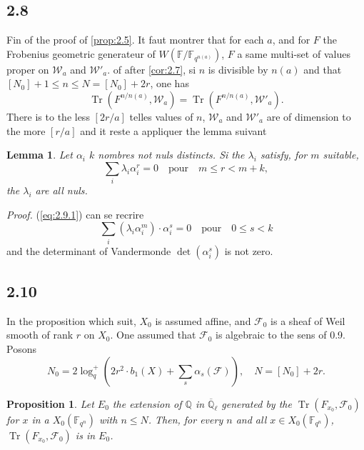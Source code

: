 \documentclass[11pt,a4paper]{article}
\theoremstyle{plain}
\newtheorem{lemma}[theorem]{Lemma}
\newtheorem{proposition}[theorem]{Proposition}
\theoremstyle{definition}
\DeclareMathOperator{\tr}{Tr}
\begin{document}
\subsection{2.8}

Fin of the proof of \ref{prop:2.5}. It faut montrer that for each $a$, and for $F$ the Frobenius geometric generateur of $W(\mathbb{F}/\mathbb{F}_{q^{n(a)}})$, $F$ a same multi-set of values proper on $\mathcal{W}_a$ and $\mathcal{W}'_a$. of after \ref{cor:2.7}, si $n$ is divisible by $n(a)$ and that $[N_0]+1 \leq n \leq N = [N_0]+2r$, one has
\[
\tr(F^{n/n(a)}, \mathcal{W}_a) = \tr(F^{n/n(a)}, \mathcal{W}'_a).
\]
There is to the less $[2r/a]$ telles values of $n$, $\mathcal{W}_a$ and $\mathcal{W}'_a$ are of dimension to the more $[r/a]$ and it reste a appliquer the lemma suivant

\begin{lemma}\label{lem:2.9}
Let $\alpha_i$ $k$ nombres not nuls distincts. Si the $\lambda_i$ satisfy, for $m$ suitable,
\begin{equation}\label{eq:2.9.1}
\sum_i \lambda_i \alpha_i^r = 0 \quad \text{pour} \quad m \leq r < m+k,
\end{equation}
the $\lambda_i$ are all nuls.
\end{lemma}

\noindent\textit{Proof.} (\ref{eq:2.9.1}) can se recrire
\[
\sum_i (\lambda_i \alpha_i^m) \cdot \alpha_i^s = 0 \quad \text{pour} \quad 0 \leq s < k
\]
and the determinant of Vandermonde $\det(\alpha_i^s)$ is not zero.

\subsection{2.10}

In the proposition which suit, $X_0$ is assumed affine, and $\mathcal{F}_0$ is a sheaf of Weil smooth of rank $r$ on $X_0$. One assumed that $\mathcal{F}_0$ is algebraic to the sens of 0.9. Posons
\[
N_0 = 2\log_q^+\left(2r^2 \cdot b_1(X) + \sum_s \alpha_s(\mathcal{F})\right), \quad N = [N_0] + 2r.
\]
\begin{proposition}\label{prop:2.10}
Let $E_0$ the extension of $\mathbb{Q}$ in $\overline{\mathbb{Q}}_\ell$ generated by the $\tr(F_{x_0}, \mathcal{F}_0)$ for $x$ in a $X_0(\mathbb{F}_{q^n})$ with $n \leq N$. Then, for every $n$ and all $x \in X_0(\mathbb{F}_{q^n})$, $\tr(F_{x_0}, \mathcal{F}_0)$ is in $E_0$.
\end{proposition}
\end{document}
